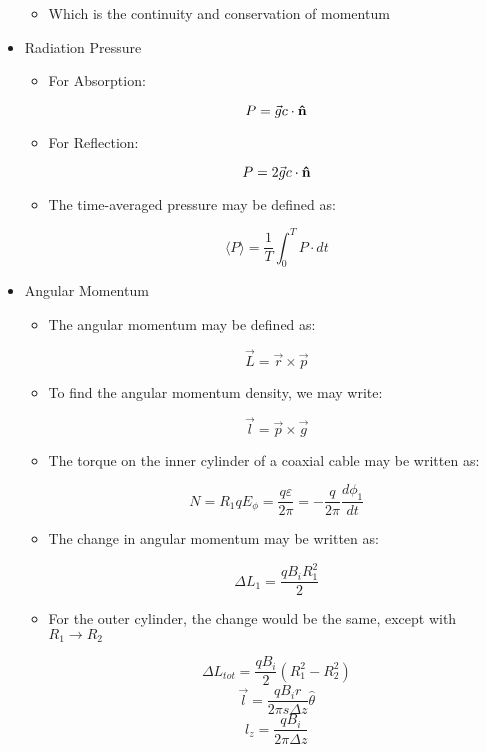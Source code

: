 \begin{itemize}
\begin{itemize}
      \item Which is the continuity and conservation of momentum

    \end{itemize}

  \item Radiation Pressure

    \begin{itemize}

      \item For Absorption:

        $$P=\vec{g}c\cdot\bold{\hat{n}}$$

      \item For Reflection:

        $$P=2\vec{g}c\cdot\bold{\hat{n}}$$

      \item The time-averaged pressure may be defined as:

        $$\langle P\rangle=\frac{1}{T}\int_0^TP\cdot dt$$

    \end{itemize}

  \item Angular Momentum

    \begin{itemize}

      \item The angular momentum may be defined as:

        $$\vec{L}=\vec{r}\times\vec{p}$$

      \item To find the angular momentum density, we may write:

        $$\vec{l}=\vec{p}\times\vec{g}$$

      \item The torque on the inner cylinder of a coaxial cable may be written as:

        $$N=R_1qE_{\phi}=\frac{q\varepsilon}{2\pi}=-\frac{q}{2\pi}\frac{d\phi_1}{dt}$$

      \item The change in angular momentum may be written as:

        $$\Delta L_1=\frac{qB_iR_1^2}{2}$$

      \item For the outer cylinder, the change would be the same, except with $R_1\to R_2$

        $$\Delta L_{tot}=\frac{qB_i}{2}(R_1^2-R_2^2)$$
        $$\vec{l}=\frac{qB_i r}{2\pi s\Delta z}\hat{\theta}$$
        $$l_z=\frac{qB_i}{2\pi\Delta z}$$


\end{itemize}
\end{itemize}
